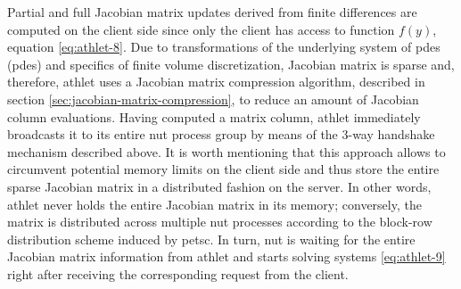 Partial and full Jacobian matrix updates derived from finite differences are computed on the client side since only the client has access to function $f(y)$, equation \ref{eq:athlet-8}. Due to transformations of the underlying system of \acrlong{pde}s (\acrshort{pde}s) and specifics of finite volume discretization, Jacobian matrix is sparse and, therefore, \acrshort{athlet} uses a Jacobian matrix compression algorithm, described in section \ref{sec:jacobian-matrix-compression}, to reduce an amount of Jacobian column evaluations. Having computed a matrix column, \acrshort{athlet} immediately broadcasts it to its entire \acrshort{nut} process group by means of the 3-way handshake mechanism described above. It is worth mentioning that this approach allows to circumvent potential memory limits on the client side and thus store the entire sparse Jacobian matrix in a distributed fashion on the server. In other words, \acrshort{athlet} never holds the entire Jacobian matrix in its memory; conversely, the matrix is distributed across multiple \acrshort{nut} processes according to the block-row distribution scheme induced by \acrshort{petsc}. In turn, \acrshort{nut} is waiting for the entire Jacobian matrix information from \acrshort{athlet} and starts solving systems \ref{eq:athlet-9} right after receiving the corresponding request from the client.\\


